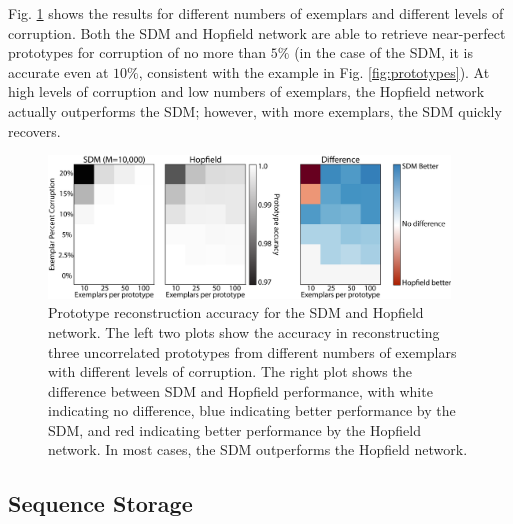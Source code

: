 \documentclass[10pt,letterpaper]{article}
\begin{document}
Fig. \ref{fig:prototype-comparison} shows the results for different
numbers of exemplars and different levels of corruption. Both the SDM
and Hopfield network are able to retrieve near-perfect prototypes for
corruption of no more than $5\%$ (in the case of the SDM, it is
accurate even at $10\%$, consistent with the example in
Fig. \ref{fig:prototypes}). At high levels of corruption and low
numbers of exemplars, the Hopfield network actually outperforms the
SDM; however, with more exemplars, the SDM quickly recovers.


\begin{figure}[t!]
  \begin{center}
    \includegraphics[width=0.95\textwidth]{./figures/prototype-edit.png}
  \end{center}
  \caption{Prototype reconstruction accuracy for the SDM and Hopfield
    network. The left two plots show the accuracy in reconstructing
    three uncorrelated prototypes from different numbers of exemplars
    with different levels of corruption. The right plot shows the
    difference between SDM and Hopfield performance, with white
    indicating no difference, blue indicating better performance by
    the SDM, and red indicating better performance by the Hopfield
    network. In most cases, the SDM outperforms the Hopfield network.}
  \label{fig:prototype-comparison}
\end{figure}


\subsection{Sequence Storage}
\end{document}
